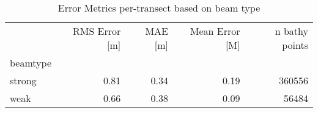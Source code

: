 \begin{table}[htbp]
\centering
\caption{Error Metrics per-transect based on beam type}
\label{tab:error-by-strongweak}
\begin{tabular}{lrrrr}
\toprule
 & RMS Error [m] & MAE [m] & Mean Error [M] & n bathy points \\
beamtype &  &  &  &  \\
\midrule
strong & 0.81 & 0.34 & 0.19 & 360556 \\
weak & 0.66 & 0.38 & 0.09 & 56484 \\
\bottomrule
\end{tabular}
\end{table}
